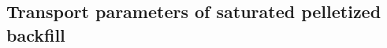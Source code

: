 




\subsection{Transport parameters of saturated pelletized backfill}
\label{sec:transport_pellets}

